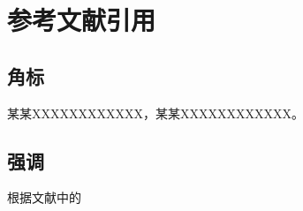 \section{参考文献引用}

\subsection{角标}

某某\cite{ref_thesis}XXXXXXXXXXXX，某某\cite{ref_book}XXXXXXXXXXXX。

\subsection{强调}

根据文献中\parencite{ref_article}的

















